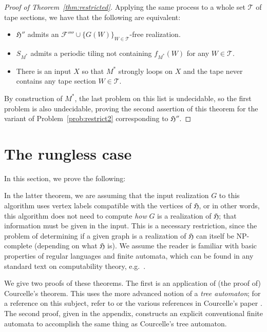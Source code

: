 \documentclass{article}
\newcommand{\Fc}{\mathcal{F}}
\newcommand{\Hf}{\mathfrak{H}}
\newcommand{\Tc}{\mathcal{T}}
\begin{document}
\begin{proof}[Proof of Theorem~\ref{thm:restricted}]
Applying the same process to a whole set $\Tc$ of tape sections, we have that the following are equivalent:
\begin{itemize}
    \item $\Hf''$ admits an $\Fc''''\cup\{G(W)\}_{W\in \Tc}$-free realization.
    \item $S_{M^*}$ admits a periodic tiling not containing $f_{M^*}(W)$ for any $W\in \Tc$.
    \item There is an input $X$ so that $M^*$ strongly loops on $X$ and the tape never contains any tape section $W\in \Tc$.
\end{itemize}

By construction of $M^*$, the last problem on this list is undecidable, so the first problem is also undecidable, proving the second assertion of this theorem for the variant of Problem~\ref{prob:restrict2} corresponding to $\Hf''$.
\end{proof}

\section{The rungless case}
\label{sec:rungless}

In this section, we prove the following:

\rungless*
\lineartime*

In the latter theorem, we are assuming that the input realization $G$ to this algorithm uses vertex labels compatible with the vertices of $\Hf$, or in other words, this algorithm does not need to compute \textit{how} $G$ is a realization of $\Hf$; that information must be given in the input. This is a necessary restriction, since the problem of determining if a given graph is a realization of $\Hf$ can itself be NP-complete (depending on what $\Hf$ is). We assume the reader is familiar with basic properties of regular languages and finite automata, which can be found in any standard text on computability theory, e.g.\ \cite{sipser}.

We give two proofs of these theorems. The first is an application of (the proof of) Courcelle's theorem. This uses the more advanced notion of a \textit{tree automaton}; for a reference on this subject, refer to \cite{tata} or the various references in Courcelle's paper \cite{courcelle}. The second proof, given in the appendix, constructs an explicit conventional finite automata to accomplish the same thing as Courcelle's tree automaton.
\end{document}
